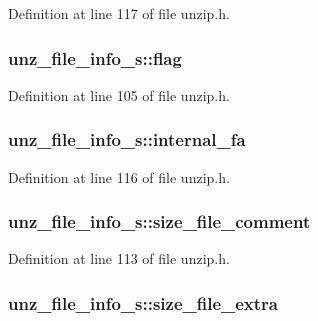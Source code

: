 Definition at line 117 of file unzip.\-h.

\hypertarget{structunz__file__info__s_adff7171a3114d55e5532c593b1779ecc}{
\subsubsection[{flag}]{ unz\-\_\-file\-\_\-info\-\_\-s\-::flag}}\label{structunz__file__info__s_adff7171a3114d55e5532c593b1779ecc}


Definition at line 105 of file unzip.\-h.

\hypertarget{structunz__file__info__s_aa20738bf82bca71cc950b9475b5d8c3c}{
\subsubsection[{internal\-\_\-fa}]{ unz\-\_\-file\-\_\-info\-\_\-s\-::internal\-\_\-fa}}\label{structunz__file__info__s_aa20738bf82bca71cc950b9475b5d8c3c}


Definition at line 116 of file unzip.\-h.

\hypertarget{structunz__file__info__s_afa9feffb3b9c9c03e02599118d5f548e}{
\subsubsection[{size\-\_\-file\-\_\-comment}]{ unz\-\_\-file\-\_\-info\-\_\-s\-::size\-\_\-file\-\_\-comment}}\label{structunz__file__info__s_afa9feffb3b9c9c03e02599118d5f548e}


Definition at line 113 of file unzip.\-h.

\hypertarget{structunz__file__info__s_a479402dcb3555c922e3ce87c8f967990}{
\subsubsection[{size\-\_\-file\-\_\-extra}]{ unz\-\_\-file\-\_\-info\-\_\-s\-::size\-\_\-file\-\_\-extra}}\label{structunz__file__info__s_a479402dcb3555c922e3ce87c8f967990}


